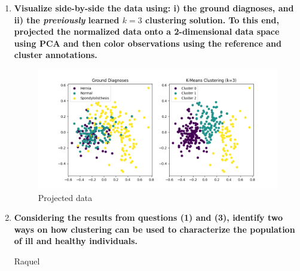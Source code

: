 \documentclass[12pt]{article}
\begin{document}
\begin{enumerate}[leftmargin=\labelsep]
\begin{enumerate}
    \end{enumerate}

    \item \textbf{Visualize side-by-side the data using: i) the ground diagnoses, and ii) the \textit{previously} learned
          $k = 3$ clustering solution. To this end, projected the normalized data onto a 2-dimensional data
          space using PCA and then color observations using the reference and cluster annotations.}

          \vskip 0.3cm
          

          \begin{figure}[H]
            \centering
            \includegraphics[width=17cm]{./assets/ex3-plot.png}
            \caption{Projected data}
            \label{fig:PartII-ex3}
        \end{figure}

    \item \textbf{Considering the results from questions (1) and (3), identify two ways on how clustering can
          be used to characterize the population of ill and healthy individuals.}

          \vskip 0.3cm
          Raquel
\end{enumerate}
\end{document}
